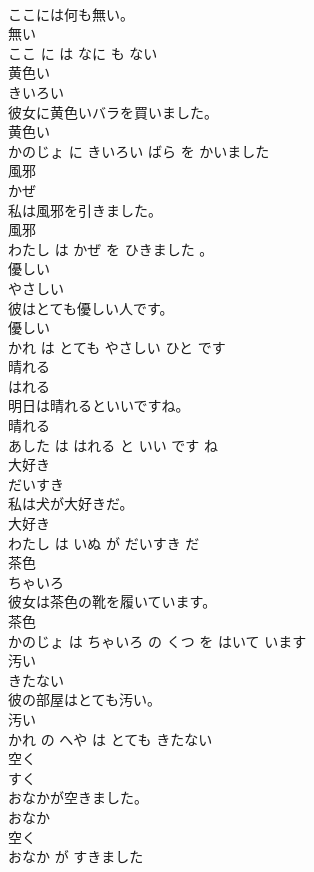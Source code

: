 \documentclass[8pt]{extreport}
\begin{document}
\begin{CJK}{UTF8}{min}
\\	ここには何も無い。	
\\	無い 
\\	ここ に は なに も ない			
\\	黄色い	
\\	きいろい			
\\	彼女に黄色いバラを買いました。	
\\	黄色い 
\\	かのじょ に きいろい ばら を かいました			
\\	風邪	
\\	かぜ			
\\	私は風邪を引きました。	
\\	風邪 
\\	わたし は かぜ を ひきました 。			
\\	優しい	
\\	やさしい			
\\	彼はとても優しい人です。	
\\	優しい 
\\	かれ は とても やさしい ひと です			
\\	晴れる	
\\	はれる			
\\	明日は晴れるといいですね。	
\\	晴れる 
\\	あした は はれる と いい です ね			
\\	大好き	
\\	だいすき			
\\	私は犬が大好きだ。	
\\	大好き 
\\	わたし は いぬ が だいすき だ			
\\	茶色	
\\	ちゃいろ			
\\	彼女は茶色の靴を履いています。	
\\	茶色 
\\	かのじょ は ちゃいろ の くつ を はいて います			
\\	汚い	
\\	きたない			
\\	彼の部屋はとても汚い。	
\\	汚い 
\\	かれ の へや は とても きたない			
\\	空く	
\\	すく			
\\	おなかが空きました。	
\\	おなか 
\\	空く 
\\	おなか が すきました			

\end{CJK}
\end{document}
